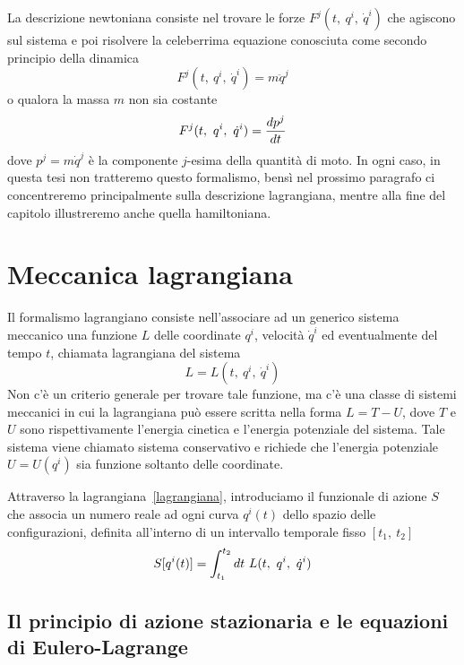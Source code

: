     La descrizione newtoniana consiste nel trovare le forze $F^j(t, ~q^i, ~ \dot q^i)$ che agiscono sul sistema e poi risolvere la celeberrima equazione conosciuta come secondo principio della dinamica
    \begin{equation*}
        F^j(t, ~q^i, ~ \dot q^i) = m \ddot q^j
    \end{equation*}
    o qualora la massa $m$ non sia costante 
    \begin{equation*}
        F^j(t, ~q^i, ~ \dot q^i) = \frac{dp^j}{dt}
    \end{equation*}
    dove $p^j = m \dot q^j$ è la componente $j$-esima della quantità di moto. In ogni caso, in questa tesi non tratteremo questo formalismo, bensì nel prossimo paragrafo ci concentreremo principalmente sulla descrizione lagrangiana, mentre alla fine del capitolo illustreremo anche quella hamiltoniana.
    
\section{Meccanica lagrangiana}

    Il formalismo lagrangiano consiste nell'associare ad un generico sistema meccanico una funzione $L$ delle coordinate $q^i$, velocità $\dot q^i$ ed eventualmente del tempo $t$, chiamata lagrangiana del sistema
    \begin{equation} \label{lagrangiana}
        L = L(t, ~q^i, ~\dot q^i) 
    \end{equation}  
    Non c'è un criterio generale per trovare tale funzione, ma c'è una classe di sistemi meccanici in cui la lagrangiana può essere scritta nella forma $L = T - U$, dove $T$ e $U$ sono rispettivamente l'energia cinetica e l'energia potenziale del sistema. Tale sistema viene chiamato sistema conservativo e richiede che l'energia potenziale $U = U(q^i)$ sia funzione soltanto delle coordinate.
    
    Attraverso la lagrangiana~\eqref{lagrangiana}, introduciamo il funzionale di azione $S$ che associa un numero reale ad ogni curva $q^i(t)$ dello spazio delle configurazioni, definita all'interno di un intervallo temporale fisso $[t_1, ~t_2]$
    \begin{equation} \label{azione}
        S[q^i(t)] = \int_{t_1}^{t_2}dt~ L(t, ~q^i, ~\dot q^i)
    \end{equation}

\subsection{Il principio di azione stazionaria e le equazioni di Eulero-Lagrange}

